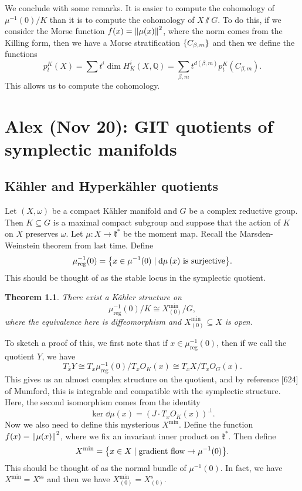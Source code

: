\documentclass[leqno, openany]{memoir}
\newtheorem{thm}{Theorem}[section]
\theoremstyle{definition}
\theoremstyle{remark}
\theoremstyle{plain}
\theoremstyle{definition}
\theoremstyle{remark}
\newcommand{\Q}{\mathbb{Q}}
\newcommand{\mf}[1]{\mathfrak{#1}}
\newcommand{\mr}[1]{\mathrm{#1}}
\newcommand{\ol}[1]{\overline{#1}}
\begin{document}
We conclude with some remarks. It is easier to compute the cohomology of
$\mu^{-1}(0) / K$ than it is to compute the cohomology of $X \sslash G$. To do
this, if we consider the Morse function $f(x) = \norm{\mu(x)}^2$, where the
norm comes from the Killing form, then we have a Morse stratification
$\qty{C_{\beta, m}}$ and then we define the functions \[ p_t^K(X) = \sum t^i
\dim H_K^i(X,\Q) = \sum_{\beta, m} t^{d(\beta, m)} p_t^K(C_{\beta, m}). \] This
allows us to compute the cohomology.

\chapter{Alex (Nov 20): GIT quotients of symplectic manifolds}%
\label{cha:alex_nov_20_git_quotients_of_symplectic_manifolds}

\section{K\"ahler and Hyperk\"ahler quotients}%
\label{sec:k"ahler_and_hyperk"ahler_quotients}

Let $(X, \omega)$ be a compact K\"ahler manifold and $G$ be a complex reductive
group. Then $K \subseteq G$ is a maximal compact subgroup and suppose that the
action of $K$ on $X$ preserves $\omega$. Let $\mu \colon X \to \mf{k}^*$ be the
moment map. Recall the Marsden-Weinstein theorem from last time. Define \[
\mu_{\mr{reg}}^{-1}(0) = \qty{x \in \mu^{-1}(0) \mid \dd{\mu}(x) \text{ is
surjective}}. \] This should be thought of as the stable locus in the
symplectic quotient.

\begin{thm} There exist a K\"ahler structure on \[ \mu_{\mr{reg}}^{-1}(0) / K
\cong X_{(0)}^{\mr{min}} / G, \] where the equivalence here is diffeomorphism
and $X_{(0)}^{\mr{min}} \subseteq X$ is open.  \end{thm}

To sketch a proof of this, we first note that if $x \in
\mu_{\mr{reg}}^{-1}(0)$, then if we call the quotient $Y$, we have \[
T_{\ol{x}} Y \cong T_x \mu^{-1}_{\mr{reg}}(0) / T_x O_K(x) \cong T_x X / T_x
O_G(x). \] This gives us an almost complex structure on the quotient, and by
reference [624] of Mumford, this is integrable and compatible with the
symplectic structure. Here, the second isomorphism comes from the identity \[
\ker \dd{\mu(x)} = (J \cdot T_x O_K(x))^{\perp}. \] Now we also need to define
this mysterious $X^{\mr{min}}$. Define the function $f(x) = \norm{\mu(x)}^2$,
where we fix an invariant inner product on $\mf{k}^*$. Then define \[
X^{\mr{min}} = \qty{ x \in X \mid \text{gradient flow} \to \mu^{-1}(0) }. \]
This should be thought of as the normal bundle of $\mu^{-1}(0)$. In fact, we
have $X^{\mr{min}} = X^{\mr{ss}}$ and then we have $X_{(0)}^{\mr{min}} =
X_{(0)}^{s}$.
\end{document}
